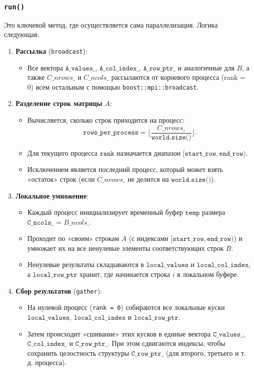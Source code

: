 \documentclass[12pt]{article}
\begin{document}
\subsubsection{\texttt{run()}}
Это ключевой метод, где осуществляется сама параллелизация. Логика следующая:
\begin{enumerate}
    \item \textbf{Рассылка} (\texttt{broadcast}):
    \begin{itemize}
        \item Все вектора \(\texttt{A\_values\_}\), \(\texttt{A\_col\_index\_}\), \(\texttt{A\_row\_ptr\_}\) и аналогичные для \(B\), а также \(C\_nrows\_\) и \(C\_ncols\_\) рассылаются от корневого процесса (rank = 0) всем остальным с помощью \texttt{boost::mpi::broadcast}.
    \end{itemize}
    \item \textbf{Разделение строк матрицы \(A\)}:
    \begin{itemize}
        \item Вычисляется, сколько строк приходится на процесс: 
        \[
          \texttt{rows\_per\_process} = \lfloor \frac{C\_nrows\_}{\texttt{world.size()}} \rfloor.
        \]
        \item Для текущего процесса \(\texttt{rank}\) назначается диапазон \([\texttt{start\_row}, \texttt{end\_row})\). 
        \item Исключением является последний процесс, который может взять «остаток» строк (если \(C\_nrows\_\) не делится на \(\texttt{world.size()}\)).
    \end{itemize}
    \item \textbf{Локальное умножение}:
    \begin{itemize}
        \item Каждый процесс инициализирует временный буфер \(\texttt{temp}\) размера \(\texttt{C\_ncols\_}\) = \(B\_ncols\_\).
        \item Проходит по «своим» строкам \(A\) (с индексами \([\texttt{start\_row}, \texttt{end\_row})\)) и умножает их на все ненулевые элементы соответствующих строк \(B\).
        \item Ненулевые результаты складываются в \(\texttt{local\_values}\) и \(\texttt{local\_col\_index}\), а \(\texttt{local\_row\_ptr}\) хранит, где начинается строка \(i\) в локальном буфере.
    \end{itemize}
    \item \textbf{Сбор результатов} (\texttt{gather}):
    \begin{itemize}
        \item На нулевой процесс (\texttt{rank = 0}) собираются все локальные куски \(\texttt{local\_values}\), \(\texttt{local\_col\_index}\) и \(\texttt{local\_row\_ptr}\).
        \item Затем происходит «сшивание» этих кусков в единые вектора \(\texttt{C\_values\_}\), \(\texttt{C\_col\_index\_}\) и \(\texttt{C\_row\_ptr\_}\). 
          При этом сдвигаются индексы, чтобы сохранить целостность структуры \(\texttt{C\_row\_ptr\_}\) (для второго, третьего и т. д. процесса).
    \end{itemize}
\end{enumerate}
\end{document}
